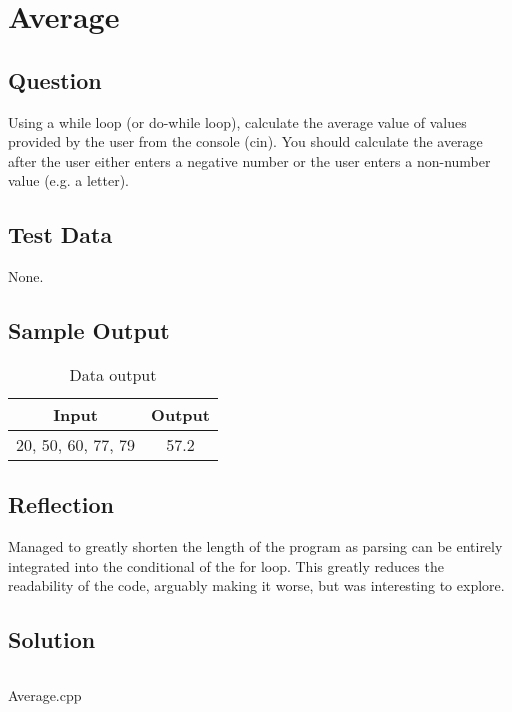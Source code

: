 \documentclass[main.tex]{subfiles}
\begin{document}
    \section{Average}
        \subsection{Question}
        Using a while loop (or do-while loop), calculate the average value of values provided by the user from the console (cin).
        You should calculate the average after the user either enters a negative number or the user enters a non-number value (e.g. a letter).
            
        \subsection{Test Data}
            None.
        
        \subsection{Sample Output}
            \begin{table}[H]
                \centering
                \begin{tabular}{c c}
                    \hline
                    \textbf{Input} & \textbf{Output} \\
                    \hline
                    20, 50, 60, 77, 79 & 57.2 \\
                    \hline
                \end{tabular}
                \caption{Data output}
            \end{table}

        \subsection{Reflection}
            Managed to greatly shorten the length of the program as parsing can
            be entirely integrated into the conditional of the for loop.
            This greatly reduces the readability of the code, arguably making it worse,
            but was interesting to explore.
        
        \subsection{Solution}
            \begin{listing}[H]
                \inputminted{cpp}{../Tasks/06-Average/Average.cpp}%
                \caption{Average.cpp}
            \end{listing}
\end{document}
